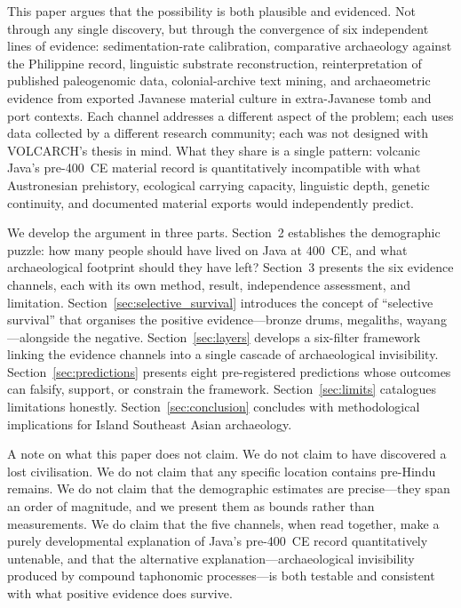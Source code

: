 \documentclass[12pt,a4paper]{article}
\begin{document}
This paper argues that the possibility is both plausible and evidenced. Not through any single discovery, but through the convergence of six independent lines of evidence: sedimentation-rate calibration, comparative archaeology against the Philippine record, linguistic substrate reconstruction, reinterpretation of published paleogenomic data, colonial-archive text mining, and archaeometric evidence from exported Javanese material culture in extra-Javanese tomb and port contexts. Each channel addresses a different aspect of the problem; each uses data collected by a different research community; each was not designed with VOLCARCH's thesis in mind. What they share is a single pattern: volcanic Java's pre-400~CE material record is quantitatively incompatible with what Austronesian prehistory, ecological carrying capacity, linguistic depth, genetic continuity, and documented material exports would independently predict.

We develop the argument in three parts. Section~2 establishes the demographic puzzle: how many people should have lived on Java at 400~CE, and what archaeological footprint should they have left? Section~3 presents the six evidence channels, each with its own method, result, independence assessment, and limitation. Section~\ref{sec:selective_survival} introduces the concept of ``selective survival'' that organises the positive evidence---bronze drums, megaliths, wayang---alongside the negative. Section~\ref{sec:layers} develops a six-filter framework linking the evidence channels into a single cascade of archaeological invisibility. Section~\ref{sec:predictions} presents eight pre-registered predictions whose outcomes can falsify, support, or constrain the framework. Section~\ref{sec:limits} catalogues limitations honestly. Section~\ref{sec:conclusion} concludes with methodological implications for Island Southeast Asian archaeology.

A note on what this paper does not claim. We do not claim to have discovered a lost civilisation. We do not claim that any specific location contains pre-Hindu remains. We do not claim that the demographic estimates are precise---they span an order of magnitude, and we present them as bounds rather than measurements. We do claim that the five channels, when read together, make a purely developmental explanation of Java's pre-400~CE record quantitatively untenable, and that the alternative explanation---archaeological invisibility produced by compound taphonomic processes---is both testable and consistent with what positive evidence does survive.
\end{document}
